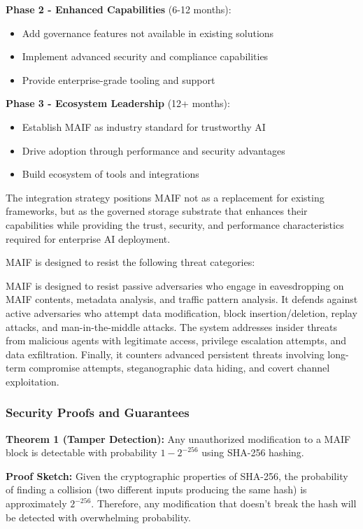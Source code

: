 \documentclass[conference]{IEEEtran}
\begin{document}
\textbf{Phase 2 - Enhanced Capabilities} (6-12 months):
\begin{itemize}[leftmargin=*]
\item Add governance features not available in existing solutions
\item Implement advanced security and compliance capabilities
\item Provide enterprise-grade tooling and support
\end{itemize}

\textbf{Phase 3 - Ecosystem Leadership} (12+ months):
\begin{itemize}[leftmargin=*]
\item Establish MAIF as industry standard for trustworthy AI
\item Drive adoption through performance and security advantages
\item Build ecosystem of tools and integrations
\end{itemize}

The integration strategy positions MAIF not as a replacement for existing frameworks, but as the governed storage substrate that enhances their capabilities while providing the trust, security, and performance characteristics required for enterprise AI deployment.

MAIF is designed to resist the following threat categories:

MAIF is designed to resist passive adversaries who engage in eavesdropping on MAIF contents, metadata analysis, and traffic pattern analysis. It defends against active adversaries who attempt data modification, block insertion/deletion, replay attacks, and man-in-the-middle attacks. The system addresses insider threats from malicious agents with legitimate access, privilege escalation attempts, and data exfiltration. Finally, it counters advanced persistent threats involving long-term compromise attempts, steganographic data hiding, and covert channel exploitation.

\subsubsection{Security Proofs and Guarantees}

\textbf{Theorem 1 (Tamper Detection):} Any unauthorized modification to a MAIF block is detectable with probability $1 - 2^{-256}$ using SHA-256 hashing.

\textbf{Proof Sketch:} Given the cryptographic properties of SHA-256, the probability of finding a collision (two different inputs producing the same hash) is approximately $2^{-256}$. Therefore, any modification that doesn't break the hash will be detected with overwhelming probability.
\end{document}
